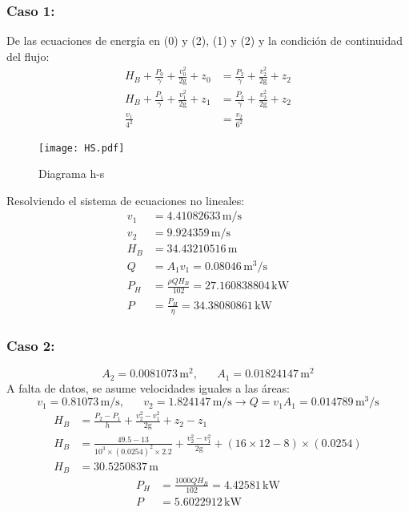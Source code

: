 \documentclass[a4paper,12pt]{article}
\newcommand{\mrm}{\mathrm}
\begin{document}
\subsubsection*{Caso 1:}
De las ecuaciones de energía en (0) y (2), (1) y (2) y la condición de continuidad del flujo:
\begin{align}
    H_{B} + \frac{P_{0}}{\gamma} + \frac{v_{0}^{2}}{2\mrm{g}} + z_{0} &= \frac{P_{2}}{\gamma} + \frac{v^{2}_{2}}{2\mrm{g}} + z_{2}\\[4pt]
    H_{B} + \frac{P_{1}}{\gamma} + \frac{v^{2}_{1}}{2\mrm{g}} + z_{1} &= \frac{P_{2}}{\gamma} + \frac{v^{2}_{2}}{2\mrm{g}} + z_{2}\\[4pt]
    \frac{v_{1}}{4^2} &= \frac{v_{2}}{6^2}
\end{align}
\begin{figure}[H]
    \centering
    \texttt{[image: HS.pdf]}
    \caption{Diagrama h-s}
\end{figure}
Resolviendo el sistema de ecuaciones no lineales:
\begin{align}
    v_{1} &= 4.41082633\,\mrm{m/s} \\[3pt]
    v_{2} &= 9.924359\, \mrm{m/s} \\[3pt]
    H_{B} &= 34.43210516\,\mrm{m} \\[3pt]
    Q &= A_{1}v_{1} = 0.08046\,\mrm{m^{3}/s}\\[4pt]
    P_{H} &= \frac{\rho Q H_{B}}{102} = 27.160838804\,\mrm{kW}\\[4pt]
    P &= \frac{P_{H}}{\eta} = 34.38080861\,\mrm{kW}
\end{align}
\subsubsection*{Caso 2:}
\begin{equation}
A_{2} = 0.0081073\,\mrm{m^{2}}, \hspace{20pt} A_{1} = 0.01824147\,\mrm{m^{2}}
\end{equation}
A falta de datos, se asume velocidades iguales a las áreas:
\begin{equation}
    v_{1} = 0.81073\,\mrm{m/s},\hspace{20pt} v_{2} = 1.824147\,\mrm{m/s} \longrightarrow Q = v_{1}A_{1} = 0.014789\,\mrm{m^{3}/s}
\end{equation}
\begin{align}
    H_{B} &= \frac{P_{2}-P_{1}}{h} + \frac{v^{2}_{2}-v^{2}_{1}}{2\mrm{g}} + z_{2}-z_{1}\\[4pt]
    H_{B} &= \frac{49.5-13}{10^{3}\times (0.0254)^{2}\times 2.2} + \frac{v^{2}_{2}-v^{2}_{1}}{2\mrm{g}} + (16\times 12 - 8)\times(0.0254)\\[4pt]
    H_{B} &= 30.5250837\,\mrm{m}
\end{align}
\begin{align}
    P_{H} &= \frac{1000 Q H_{B}}{102} = 4.42581\,\mrm{kW} \\[3pt]
    P &= 5.6022912\,\mrm{kW}
\end{align}
\end{document}
